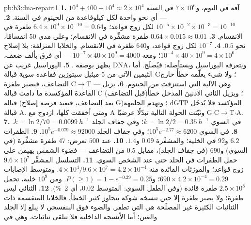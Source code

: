 \begin{solution}{pb:b3:dna-repair:1}
\textbf{1.} $10^{4} + 400 + 10^{4} \approx 2\times 10^{4}$ آفة في
اليوم، و$7\times 10^{6}$ في السنة --- أي نحو واحدة لكل كيلوقاعدة من
الجينوم في السنة.
\textbf{2.} $10^{-5}\times 10^{-2}\times 10^{-3} = 10^{-10}$ لكل زوج قواعد؛
و$6.4\times 10^{9}\times 10^{-10} = 0.64$ طفرة في الانقسام.
\textbf{3.} $0.64\times 0.015 \approx 0.01$ طفرة مشفِّرة في
الانقسام؛ وعلى مدى $50$ انقسامًا، نحو $0.5$.
\textbf{4.} $10^{-7}$ لكل زوج قواعد، و$640$ طفرة في الانقسام. والخلايا
المنزلقة: بلا إصلاح $10^{-4}\times 40\times 10^{9} = 4\times 10^{6}$؛
ومعه $10^{-7}\times 40\times 10^{9} = 4000$ --- أي فرق بألف ضعف،
يظهر بوصفه .
\textbf{5.} اليوراسيل غريب عن DNA، ويتعرفه  اليوراسيل
ويستأصله: فيُصلَح. أما الثيمين الآتي من 5-ميثيل سيتوزين فقاعدة
سوية قبالة G؛ ولا شيء يعلّمه خطأً خارج التضاعف،
فيصير طفرة C$\to$T --- وهي الآلية التي استنزفت
 من الجينوم.
\textbf{6.} يزيل   القاعدةَ المؤكسدة ما دامت
قبالة C (قبل التضاعف)؛ ويزيل  الثاني
الأدنينَ المدخل خطأً قبالة  (بعد التضاعف، فيعيد
فرصة إصلاح G)؛ وتهدم الحلمهة dGTP المؤكسد فلا
يُدخَل قبالة A. ومتى أخفقت كلها، ازدوج  مع A وثبّتت
الجولة التالية تبدّلًا عرضيًا G$\cdot$C$\to$T$\cdot$A.
\textbf{7.} في السوي $k = \ln 2/2 = \qty{0.35}{h^{-1}}$؛ وفي جفاف الجلد $k = \ln 2/70
= \qty{0.0099}{h^{-1}}$.
\textbf{8.} في السوي $10^{5} e^{-2.77} \approx 6200$؛ وفي جفاف الجلد $10^{5}
e^{-0.079} \approx \num{92000}$.
\textbf{9.} الطفرات $6.2$ و$92$ في الخلية؛ والمشفِّرة $0.09$ و$1.4$.
\textbf{10.} عند $500$ تعرض: $47$ طفرة مشفِّرة (في السوي) و$690$
(في جفاف الجلد)، مقابل $0.5$ من التضاعف --- فضوء الشمس يهيمن على
حمل الطفرات في الجلد حتى عند الشخص السوي.
\textbf{11.} التسلسل المشفِّر $9.6\times 10^{7}$ زوج قواعد؛ والمورّثات
القائدة منه $4\times 10^{4}/9.6\times 10^{7} = 4.2\times 10^{-4}$. ومتوسط
الإصابات $690\times 4.2\times 10^{-4} = 0.29$؛ و$P(\ge 1) = 1 - e^{-0.29} =
0.25$. ومن $10^{9}$ خلية، تحمل $2.5\times 10^{8}$ طفرة قائدة
(وفي الطفل السوي: المتوسط $0.02$، أي \qty{2}{\%}).
\textbf{12.} الثنائي ليس طفرة؛ ولا يصير طفرة إلا حين
تنسخه شوكة بتجاوز كثير الخطأ، فالخلايا المنقسمة ذات الثنائيات
الكثيرة غير المصلَحة هي التي تطفر. والضوء فوق البنفسجي لا يبلغ
إلا الجلد والعين؛ أما الأنسجة الداخلية فلا تتلقى ثنائيات، وهي في

\end{solution}
